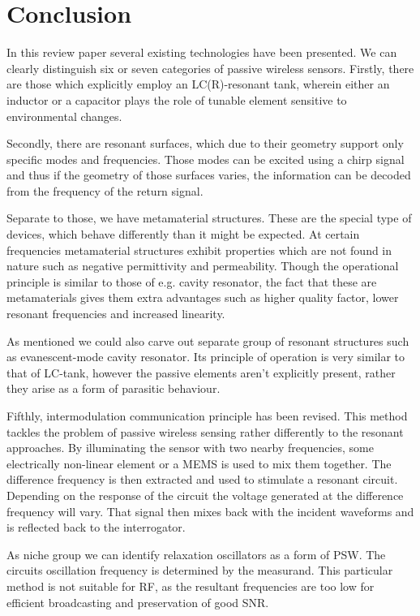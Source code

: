 \documentclass[11pt,a4paper]{article}
\begin{document}
\section{Conclusion}

In this review paper several existing technologies have been presented. We can clearly distinguish six or seven categories of passive wireless sensors. Firstly, there are those which explicitly employ an LC(R)-resonant tank, wherein either an inductor or a capacitor plays the role of tunable element sensitive to environmental changes.

Secondly, there are resonant surfaces, which due to their geometry support only specific modes and frequencies. Those modes can be excited using a chirp signal and thus if the geometry of those surfaces varies, the information can be decoded from the frequency of the return signal.

Separate to those, we have metamaterial structures. These are the special type of devices, which behave differently than it might be expected. At certain frequencies metamaterial structures exhibit properties which are not found in nature such as negative permittivity and permeability. Though the operational principle is similar to those of e.g. cavity resonator, the fact that these are metamaterials gives them extra advantages such as higher quality factor, lower resonant frequencies and increased linearity.

As mentioned we could also carve out separate group of resonant structures such as evanescent-mode cavity resonator. Its principle of operation is very similar to that of LC-tank, however the passive elements aren't explicitly present, rather they arise as a form of parasitic behaviour.

Fifthly, intermodulation communication principle has been revised. This method tackles the problem of passive wireless sensing rather differently to the resonant approaches. By illuminating the sensor with two nearby frequencies, some electrically non-linear element or a MEMS is used to mix them together. The difference frequency is then extracted and used to stimulate a resonant circuit. Depending on the response of the circuit the voltage generated at the difference frequency will vary. That signal then mixes back with the incident waveforms and is reflected back to the interrogator.

As niche group we can identify relaxation oscillators as a form of PSW. The circuits oscillation frequency is determined by the measurand. This particular method is not suitable for RF, as the resultant frequencies are too low for efficient broadcasting and preservation of good SNR.
\end{document}
